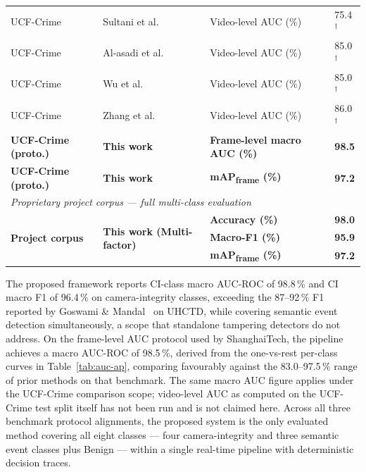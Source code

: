 \documentclass[a4paper,fleqn]{cas-dc}
\begin{document}
\begin{table}[!ht]
\begin{tabularx}{\linewidth}{p{2.05cm} p{2.15cm} >{\raggedright\arraybackslash}X p{1.55cm}}
UCF-Crime & Sultani et al.~\citep{sultani2018realworld} & Video-level AUC (\%) & 75.4$^\dagger$ \\
UCF-Crime & Al-asadi et al.~\citep{deepsta2024}         & Video-level AUC (\%) & 85.0$^\dagger$ \\
UCF-Crime & Wu et al.~\citep{wu2024vadclip}             & Video-level AUC (\%) & 85.0$^\dagger$ \\
UCF-Crime & Zhang et al.~\citep{zhang2024lagovad}       & Video-level AUC (\%) & 86.0$^\dagger$ \\
\textbf{UCF-Crime (proto.)} & \textbf{This work} & \textbf{Frame-level macro AUC (\%)} & \textbf{98.5} \\
\textbf{UCF-Crime (proto.)} & \textbf{This work} & \textbf{mAP\textsubscript{frame} (\%)} & \textbf{97.2} \\[5pt]
\multicolumn{4}{l}{\textit{Proprietary project corpus — full multi-class evaluation}} \\[2pt]
\multirow{3}{*}{\textbf{Project corpus}} & \multirow{3}{*}{\textbf{This work (Multi-factor)}} & \textbf{Accuracy (\%)}   & \textbf{98.0} \\
 &  & \textbf{Macro-F1 (\%)}   & \textbf{95.9} \\
 &  & \textbf{mAP\textsubscript{frame} (\%)} & \textbf{97.2} \\
\bottomrule
\end{tabularx}
\end{table}
 
The proposed framework reports CI-class macro AUC-ROC of 98.8\,\% and CI macro F1 of 96.4\,\% on camera-integrity classes, exceeding the 87--92\,\% F1 reported by Goswami \& Mandal~\citep{goswami2023hybrid} on UHCTD, while covering semantic event detection simultaneously, a scope that standalone tampering detectors do not address. On the frame-level AUC protocol used by ShanghaiTech, the pipeline achieves a macro AUC-ROC of 98.5\,\%, derived from the one-vs-rest per-class curves in Table~\ref{tab:auc-ap}, comparing favourably against the 83.0--97.5\,\% range of prior methods on that benchmark. The same macro AUC figure applies under the UCF-Crime comparison scope; video-level AUC as computed on the UCF-Crime test split itself has not been run and is not claimed here. Across all three benchmark protocol alignments, the proposed system is the only evaluated method covering all eight classes — four camera-integrity and three semantic event classes plus Benign — within a single real-time pipeline with deterministic decision traces.
 
\end{document}
